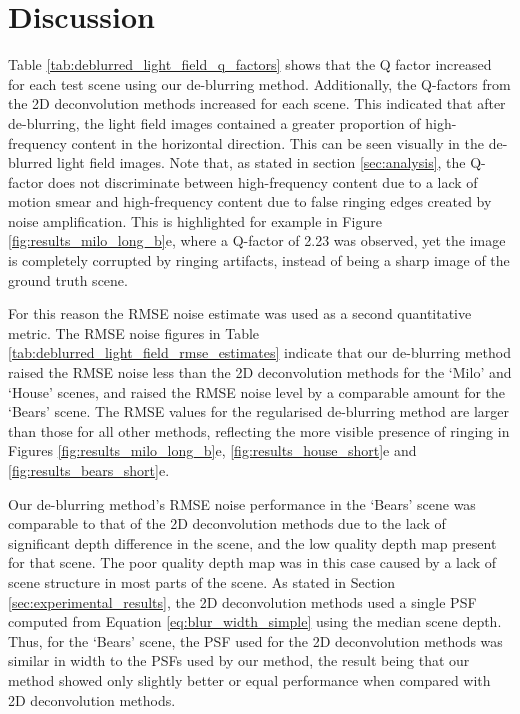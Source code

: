 \section{Discussion}
\label{sec:discussion}

Table \ref{tab:deblurred_light_field_q_factors} shows that the Q factor increased for each test scene using our de-blurring method.
Additionally, the Q-factors from the 2D deconvolution methods increased for each scene.
This indicated that after de-blurring, the light field images contained a greater proportion of high-frequency content in the horizontal direction.
This can be seen visually in the de-blurred light field images.
Note that, as stated in section \ref{sec:analysis}, the Q-factor does not discriminate between high-frequency content due to a lack of motion smear and high-frequency content due to false ringing edges created by noise amplification.
This is highlighted for example in Figure \ref{fig:results_milo_long_b}e, where a Q-factor of 2.23 was observed, yet the image is completely corrupted by ringing artifacts, instead of being a sharp image of the ground truth scene.

For this reason the RMSE noise estimate was used as a second quantitative metric.
The RMSE noise figures in Table \ref{tab:deblurred_light_field_rmse_estimates} indicate that our de-blurring method raised the RMSE noise less than the 2D deconvolution methods for the \enquote*{Milo} and \enquote*{House} scenes, and raised the RMSE noise level by a comparable amount for the \enquote*{Bears} scene.
The RMSE values for the regularised de-blurring method are larger than those for all other methods, reflecting the more visible presence of ringing in Figures \ref{fig:results_milo_long_b}e, \ref{fig:results_house_short}e and \ref{fig:results_bears_short}e.

Our de-blurring method's RMSE noise performance in the \enquote*{Bears} scene was comparable to that of the 2D deconvolution methods due to the lack of significant depth difference in the scene, and the low quality depth map present for that scene.
The poor quality depth map was in this case caused by a lack of scene structure in most parts of the scene.
As stated in Section \ref{sec:experimental_results}, the 2D deconvolution methods used a single PSF computed from Equation \ref{eq:blur_width_simple} using the median scene depth.
Thus, for the \enquote*{Bears} scene, the PSF used for the 2D deconvolution methods was similar in width to the PSFs used by our method, the result being that our method showed only slightly better or equal performance when compared with 2D deconvolution methods.

